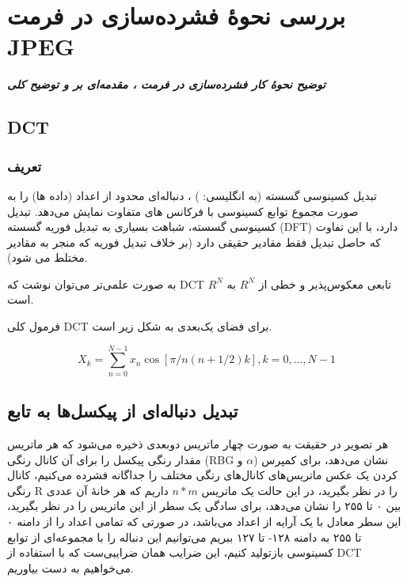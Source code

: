 \chapter{بررسی نحوهٔ فشرده‌سازی در فرمت JPEG}
\noindent
\textbf{
	\textit{
        توضیح نحوهٔ کار فشرده‌سازی در فرمت ، 
        مقدمه‌ای بر  و 
        توضیح کلی 
	}
}
\pagebreak

\section{DCT}

\subsection{
تعریف 
}

تبدیل کسینوسی گسسته (به انگلیسی:
 )
 ، دنباله‌ای محدود از اعداد (داده ها) را به‌ صورت مجموع توابع کسینوسی با فرکانس های متفاوت نمایش می‌دهد.
 تبدیل کسینوسی گسسته، شباهت بسیاری به تبدیل فوریه گسسته (DFT) دارد، با این تفاوت که حاصل تبدیل فقط مقادیر حقیقی دارد (بر خلاف تبدیل فوریه که منجر به مقادیر مختلط می شود).

 به صورت علمی‌تر می‌توان نوشت که 
 DCT 
 تابعی معکوس‌پذیر و خطی از 
 $R^N$ 
 به 
 $R^N$
 است.

 فرمول کلی DCT 
 برای فضای یک‌بعدی به شکل زیر است.

 \begin{equation}
 X_k = \sum_{n = 0}^{N - 1} x_n \cos [\pi / n  (n + 1/2)k]
 , k = 0, ..., N - 1
 \end{equation}

 \section{تبدیل دنباله‌ای از پیکسل‌ها به تابع}
هر تصویر در حقیقت به صورت چهار ماتریس دوبعدی ذخیره می‌شود که هر ماتریس مقدار رنگی پیکسل را برای آن کانال رنگی
(RBG و $\alpha$)
نشان می‌دهد، برای کمپرس کردن یک عکس ماتریس‌های کانال‌های رنگی مختلف را جداگانه فشرده می‌کنیم، کانال رنگی R 
را در نظر بگیرید، در این حالت یک ماتریس 
$n * m$ 
داریم که هر خانهٔ آن عددی بین ۰ تا ۲۵۵ را نشان می‌دهد، برای سادگی یک سطر از این ماتریس را در نظر بگیرید، این سطر معادل با یک 
آرایه از اعداد می‌باشد، در صورتی که تمامی اعداد را از دامنه ۰ تا ۲۵۵ به دامنه ۱۲۸- تا ۱۲۷ ببریم می‌توانیم این دنباله را با مجموعه‌ای از 
توابع کسینوسی بازتولید کنیم، این ضرایب همان ضرایبی‌ست که با استفاده از DCT 
می‌خواهیم به دست بیاوریم.

